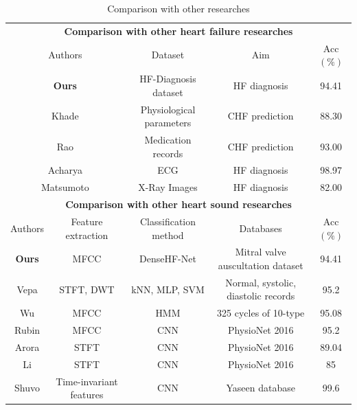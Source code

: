 \begin{table}[h]
 \caption{Comparison with other researches}
  \label{tab:Comparison}
    \centering
    \begin{tabularx}{\textwidth}{ccccc}
        \toprule
		 \multicolumn{5}{c}{\textbf{Comparison with other heart failure researches}}\\
         \multicolumn{2}{c}{Authors} & \multicolumn{1}{c}{Dataset} & \multicolumn{1}{c}{Aim}& \multicolumn{1}{c}{Acc$(\%)$} \\
        \midrule
        \multicolumn{2}{c}{\textbf{Ours}} & \multicolumn{1}{c}{HF-Diagnosis dataset} & \multicolumn{1}{c}{HF diagnosis}& 94.41\\
        \multicolumn{2}{c}{Khade \cite{khade2019system}} & \multicolumn{1}{c}{Physiological parameters}& \multicolumn{1}{c}{CHF prediction}& 88.30\\
        \multicolumn{2}{c}{Rao \cite{rao2022explainable}} & \multicolumn{1}{c}{Medication records} & \multicolumn{1}{c}{CHF prediction}& 93.00\\
        \multicolumn{2}{c}{Acharya \cite{acharya2019deep}} & \multicolumn{1}{c}{ECG} & \multicolumn{1}{c}{HF diagnosis}& 98.97\\
        \multicolumn{2}{c}{Matsumoto \cite{matsumoto2020diagnosing}} & \multicolumn{1}{c}{X-Ray Images} & \multicolumn{1}{c}{HF diagnosis}  & 82.00\\
        \toprule
		 \multicolumn{5}{c}{\textbf{Comparison with other heart sound researches}}\\
        Authors & Feature extraction & Classification method & Databases & Acc$(\%)$ \\
                \midrule
        \textbf{Ours} & MFCC & DenseHF-Net & Mitral valve auscultation dataset & 94.41 \\
        Vepa \cite{vepa2009classification} & STFT, DWT & kNN, MLP, SVM & Normal, systolic, diastolic records& 95.2\\
        Wu \cite{wu2010hidden} & MFCC & HMM & 325 cycles of 10-type& 95.08 \\
        Rubin \cite{rubin2016classifying} & MFCC & CNN & PhysioNet 2016& 95.2\\
        Arora \cite{arora2021transfer} & STFT & CNN & PhysioNet 2016& 89.04\\
        Li \cite{li2021lightweight} & STFT & CNN & PhysioNet 2016 & 85\\
        Shuvo \cite{shuvo2021cardioxnet} & Time-invariant features &CNN & Yaseen database& 99.6\\
        \bottomrule
    \end{tabularx}
\end{table}